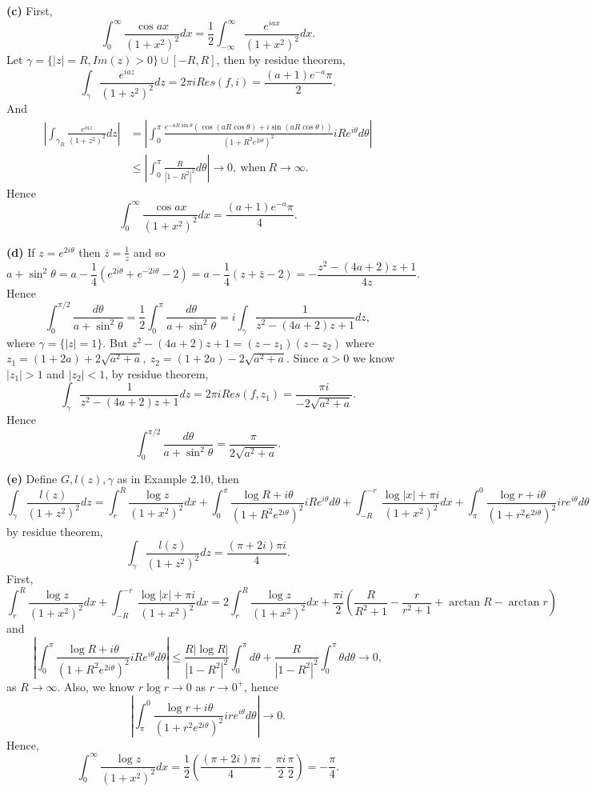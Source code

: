 \documentclass{article}%
\begin{document}
\begin{enumerate}
\textbf{(c)}
First,
$$
\int_{0}^{\infty}\frac{\cos ax}{(1+x^2)^2}dx = \frac{1}{2}\int_{-\infty}^{\infty}\frac{e^{iax}}{(1+x^2)^2}dx.
$$
Let $\gamma = \{|z|=R, Im(z) > 0\} \cup [-R, R]$, then by residue theorem,
$$
\int_{\gamma}\frac{e^{iaz}}{(1+z^2)^2}dz = 2\pi iRes(f, i) = \frac{(a+1)e^{-a}\pi}{2}.
$$
And
$$
\begin{aligned}
\left|\int_{\gamma_R}\frac{e^{iaz}}{(1+z^2)^2}dz\right| &= \left|\int_{0}^{\pi}\frac{e^{-aR\sin\theta}(\cos(aR\cos\theta)+i\sin(aR\cos\theta))}{(1+R^2e^{2i\theta})^2}iRe^{i\theta}d\theta\right| \\
&\le \left|\int_{0}^{\pi}\frac{R}{|1-R^2|^2}d\theta\right| \to 0, ~\text{when} ~R\to\infty.
\end{aligned}
$$
Hence
$$
\int_{0}^{\infty}\frac{\cos ax}{(1+x^2)^2}dx = \frac{(a+1)e^{-a}\pi}{4}.
$$

\textbf{(d)}
If $z = e^{2i\theta} $ then $\bar{z} = \frac{1}{z}$ and so
$$
a+\sin^2\theta = a-\frac{1}{4}(e^{2i\theta}+e^{-2i\theta}-2) = a-\frac{1}{4}(z+\bar{z}-2) = -\frac{z^2-(4a+2)z+1}{4z}.
$$
Hence
$$
\int_{0}^{\pi/2}\frac{d\theta}{a+\sin^2\theta} = \frac{1}{2}\int_{0}^{\pi}\frac{d\theta}{a+\sin^2\theta} = i\int_{\gamma}\frac{1}{z^2-(4a+2)z+1}dz,
$$
where $\gamma = \{|z| = 1\}$. But $z^2-(4a+2)z+1 = (z-z_1)(z-z_2) $ where $z_1 = (1+2a)+2\sqrt{a^2+a}, ~z_2 = (1+2a)-2\sqrt{a^2+a} $. Since $a > 0$ we know $|z_1| > 1 $ and $|z_2| < 1$, by residue theorem,
$$
\int_{\gamma}\frac{1}{z^2-(4a+2)z+1}dz = 2\pi iRes(f, z_1) = \frac{\pi i}{-2\sqrt{a^2+a}}.
$$
Hence
$$
\int_{0}^{\pi/2}\frac{d\theta}{a+\sin^2\theta} = \frac{\pi}{2\sqrt{a^2+a}}.
$$

\textbf{(e)}
Define $G, l(z), \gamma$ as in Example 2.10, then
$$
\int_{\gamma}\frac{l(z)}{(1+z^2)^2}dz = \int_{r}^{R}\frac{\log z}{(1+x^2)^2}dx +\int_{0}^{\pi}\frac{\log R +i\theta}{(1+R^2e^{2i\theta})^2}iRe^{i\theta}d\theta + \int_{-R}^{-r}\frac{\log |x|+\pi i}{(1+x^2)^2}dx + \int_{\pi}^{0}\frac{\log r +i\theta}{(1+r^2e^{2i\theta})^2}ire^{i\theta}d\theta
$$
by residue theorem,
$$
\int_{\gamma}\frac{l(z)}{(1+z^2)^2}dz = \frac{(\pi+2i)\pi i}{4}.
$$
First,
$$
\int_{r}^{R}\frac{\log z}{(1+x^2)^2}dx + \int_{-R}^{-r}\frac{\log |x|+\pi i}{(1+x^2)^2}dx = 2\int_{r}^{R}\frac{\log z}{(1+x^2)^2}dx + \frac{\pi i}{2}\left(\frac{R}{R^2+1}-\frac{r}{r^2+1}+\arctan R-\arctan r\right)
$$
and
$$
\left|\int_{0}^{\pi}\frac{\log R +i\theta}{(1+R^2e^{2i\theta})^2}iRe^{i\theta}d\theta\right| \le \frac{R|\log R|}{|1-R^2|^2}\int_{0}^{\pi}d\theta + \frac{R}{|1-R^2|^2}\int_{0}^{\pi}\theta d\theta \to 0,
$$
as $R\to \infty$. Also, we know $r\log r\to 0$ as $r\to 0^+ $, hence
$$
\left| \int_{\pi}^{0}\frac{\log r +i\theta}{(1+r^2e^{2i\theta})^2}ire^{i\theta}d\theta\right| \to 0.
$$
Hence,
$$
\int_{0}^{\infty}\frac{\log z}{(1+x^2)^2}dx = \frac{1}{2}\left(\frac{(\pi+2i)\pi i}{4}-\frac{\pi i}{2}\frac{\pi}{2}\right) = -\frac{\pi}{4}.
$$



\end{enumerate}
\end{document}
